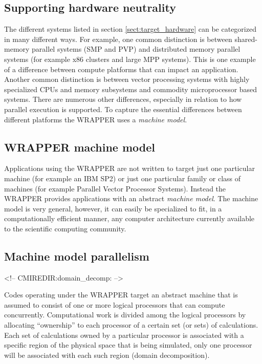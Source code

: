 \subsection{Supporting hardware neutrality}

The different systems listed in section \ref{sect:target_hardware} can
be categorized in many different ways. For example, one common
distinction is between shared-memory parallel systems (SMP and PVP)
and distributed memory parallel systems (for example x86 clusters and
large MPP systems). This is one example of a difference between
compute platforms that can impact an application. Another common
distinction is between vector processing systems with highly
specialized CPUs and memory subsystems and commodity microprocessor
based systems. There are numerous other differences, especially in
relation to how parallel execution is supported. To capture the
essential differences between different platforms the WRAPPER uses a
{\it machine model}.

\subsection{WRAPPER machine model}

Applications using the WRAPPER are not written to target just one
particular machine (for example an IBM SP2) or just one particular
family or class of machines (for example Parallel Vector Processor
Systems). Instead the WRAPPER provides applications with an abstract
{\it machine model}. The machine model is very general, however, it
can easily be specialized to fit, in a computationally efficient
manner, any computer architecture currently available to the
scientific computing community.

\subsection{Machine model parallelism}
\begin{rawhtml}
<!-- CMIREDIR:domain_decomp: -->
\end{rawhtml}

Codes operating under the WRAPPER target an abstract machine that is
assumed to consist of one or more logical processors that can compute
concurrently.  Computational work is divided among the logical
processors by allocating ``ownership'' to each processor of a certain
set (or sets) of calculations. Each set of calculations owned by a
particular processor is associated with a specific region of the
physical space that is being simulated, only one processor will be
associated with each such region (domain decomposition).

